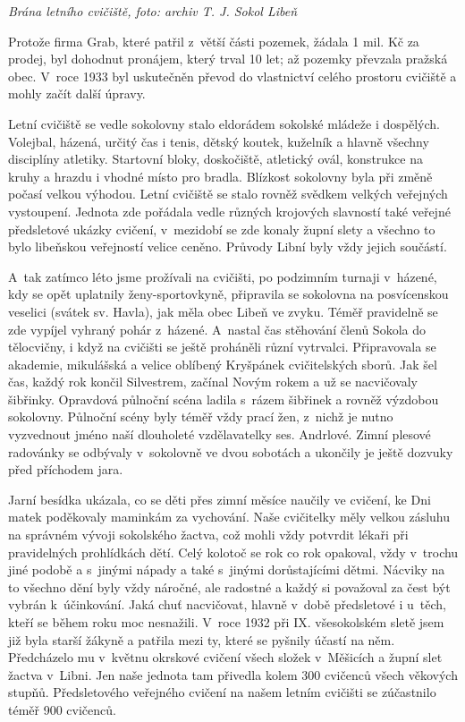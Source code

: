 \documentclass[a5paper, 11pt, twoside]{article}
\begin{document}
\textit{Brána letního cvičiště, foto: archiv T. J. Sokol Libeň}

Protože firma Grab, které patřil z~větší části pozemek, žádala 1 mil. Kč
za prodej, byl dohodnut pronájem, který trval 10 let; až pozemky
převzala pražská obec. V~roce 1933 byl uskutečněn převod do vlastnictví
celého prostoru cvičiště a mohly začít další úpravy.

Letní cvičiště se vedle sokolovny stalo eldorádem sokolské mládeže i
dospělých. Volejbal, házená, určitý čas i tenis, dětský koutek, kuželník
a hlavně všechny disciplíny atletiky. Startovní bloky, doskočiště,
atletický ovál, konstrukce na kruhy a hrazdu i vhodné místo pro bradla.
Blízkost sokolovny byla při změně počasí velkou výhodou. Letní cvičiště
se stalo rovněž svědkem velkých veřejných vystoupení. Jednota zde
pořádala vedle různých krojových slavností také veřejné předsletové
ukázky cvičení, v~mezidobí se zde konaly župní slety a všechno to bylo
libeňskou veřejností velice ceněno. Průvody Libní byly vždy jejich
součástí.

A~tak zatímco léto jsme prožívali na cvičišti, po podzimním turnaji
v~házené, kdy se opět uplatnily ženy-sportovkyně, připravila se sokolovna
na posvícenskou veselici (svátek sv. Havla), jak měla obec Libeň ve
zvyku. Téměř pravidelně se zde vypíjel vyhraný pohár z~házené. A~nastal
čas stěhování členů Sokola do tělocvičny, i když na cvičišti se ještě
proháněli různí vytrvalci. Připravovala se akademie, mikulášská a velice
oblíbený Kryšpánek cvičitelských sborů. Jak šel čas, každý rok končil
Silvestrem, začínal Novým rokem a už se nacvičovaly šibřinky. Opravdová
půlnoční scéna ladila s~rázem šibřinek a rovněž výzdobou sokolovny.
Půlnoční scény byly téměř vždy prací žen, z~nichž je nutno vyzvednout
jméno naší dlouholeté vzdělavatelky ses. Andrlové. Zimní plesové
radovánky se odbývaly v~sokolovně ve dvou sobotách a ukončily je ještě
dozvuky před příchodem jara.

Jarní besídka ukázala, co se děti přes zimní měsíce naučily ve cvičení,
ke Dni matek poděkovaly maminkám za vychování. Naše cvičitelky měly
velkou zásluhu na správném vývoji sokolského žactva, což mohli vždy
potvrdit lékaři při pravidelných prohlídkách dětí. Celý kolotoč se rok
co rok opakoval, vždy v~trochu jiné podobě a s~jinými nápady a také
s~jinými dorůstajícími dětmi. Nácviky na to všechno dění byly vždy
náročné, ale radostné a každý si považoval za čest být vybrán
k~účinkování. Jaká chuť nacvičovat, hlavně v~době předsletové i u~těch,
kteří se během roku moc nesnažili. V~roce 1932 při IX. všesokolském
sletě jsem již byla starší žákyně a patřila mezi ty, které se pyšnily
účastí na něm. Předcházelo mu v~květnu okrskové cvičení všech složek
v~Měšicích a župní slet žactva v~Libni. Jen naše jednota tam přivedla
kolem 300 cvičenců všech věkových stupňů. Předsletového veřejného
cvičení na našem letním cvičišti se zúčastnilo téměř 900 cvičenců.
\end{document}
